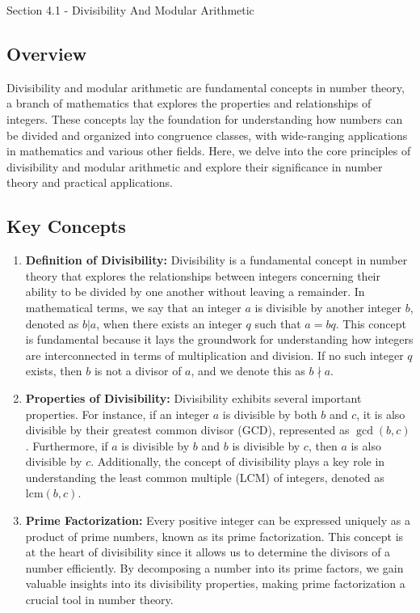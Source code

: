 \begin{notes}{Section 4.1 - Divisibility And Modular Arithmetic}
    \subsection*{Overview}

    Divisibility and modular arithmetic are fundamental concepts in number theory, a branch of mathematics that explores the properties and relationships of integers. These concepts lay the foundation 
    for understanding how numbers can be divided and organized into congruence classes, with wide-ranging applications in mathematics and various other fields. Here, we delve into the core principles 
    of divisibility and modular arithmetic and explore their significance in number theory and practical applications.

    \subsection*{Key Concepts}

    \begin{enumerate}
        \item \textbf{Definition of Divisibility:} Divisibility is a fundamental concept in number theory that explores the relationships between integers concerning their ability to be divided by one 
        another without leaving a remainder. In mathematical terms, we say that an integer $a$ is divisible by another integer $b$, denoted as $b | a$, when there exists an integer $q$ such that $a = bq$. 
        This concept is fundamental because it lays the groundwork for understanding how integers are interconnected in terms of multiplication and division. If no such integer $q$ exists, then $b$ is 
        not a divisor of $a$, and we denote this as $b \nmid a$.
    
        \item \textbf{Properties of Divisibility:} Divisibility exhibits several important properties. For instance, if an integer $a$ is divisible by both $b$ and $c$, it is also divisible by their 
        greatest common divisor (GCD), represented as $\gcd(b, c)$. Furthermore, if $a$ is divisible by $b$ and $b$ is divisible by $c$, then $a$ is also divisible by $c$. Additionally, the concept 
        of divisibility plays a key role in understanding the least common multiple (LCM) of integers, denoted as $\mathrm{lcm}(b, c)$.
    
        \item \textbf{Prime Factorization:} Every positive integer can be expressed uniquely as a product of prime numbers, known as its prime factorization. This concept is at the heart of divisibility 
        since it allows us to determine the divisors of a number efficiently. By decomposing a number into its prime factors, we gain valuable insights into its divisibility properties, making prime 
        factorization a crucial tool in number theory.
    

\end{enumerate}
\end{notes}
